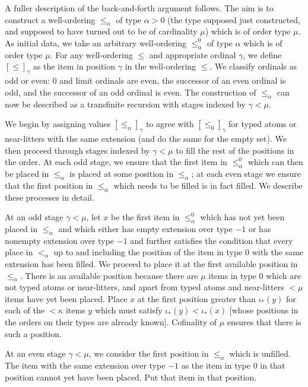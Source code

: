 \documentclass[112pt]{article}
\begin{document}
\begin{description}
A fuller description of the back-and-forth argument follows.  The aim is to construct a well-ordering $\leq_\alpha$ of type $\alpha>0$ (the type supposed just constructed, and supposed to have turned out to be of cardinality $\mu$) which is of order type $\mu$.  As initial data, we take an arbitrary well-ordering $\leq^0_\alpha$ of type $\alpha$ which is of order type $\mu$.  For any well-ordering $\leq$ and appropriate ordinal $\gamma$, we define $[\leq]_\gamma$ as the item in position $\gamma$ in the well-ordering $\leq$.  We classify ordinals as odd or even:  0 and limit ordinals are even, the successor of an even ordinal is odd, and the successor of an odd ordinal is even.  The construction of $\leq_\alpha$ can now be described as a transfinite recursion with stages indexed by $\gamma<\mu$.  

We begin by assigning values $[\leq_\alpha]_\gamma$ to agree with $[\leq_0]_\gamma$ for typed atoms or near-litters
with the same extension (and do the same for the empty set).  We then proceed through stages indexed by $\gamma<\mu$ to fill the rest of the positions in the order.  At each odd stage, we ensure that the first item in $\leq^0_\alpha$ which can then be placed in $\leq_\alpha$ is placed
at some position in $\leq_\alpha$;  at each even stage we ensure that the first position in $\leq_\alpha$ which needs to be filled is in fact filled.  We describe these processes in detail.

At an odd stage $\gamma<\mu$,  let $x$ be the first item in $\leq_\alpha^0$ which has not yet been placed in $\leq_\alpha$ and which either has empty extension over type $-1$ or has nonempty extension over type $-1$ and further satisfies the condition that every place in $<_\alpha$ up to and including the position of the item in type 0 with the same extension has been filled.
We proceed to place it at the first available position in $\leq_\alpha$.  There is an available position because there are $\mu$ items in type 0 which are not typed atoms or near-litters, and apart from typed atoms and near-litters $<\mu$ items have yet been placed.  Place $x$ at the first position greater than $\iota_*(y)$ for each of the $<\kappa$ items $y$ which must satisfy
$\iota_*(y)<\iota_*(x)$ [whose positions in the orders on their types are already known].  Cofinality of $\mu$ ensures that there is such a position.

At an even stage $\gamma<\mu$, we consider the first position in $\leq_\alpha$ which is unfilled.  The item with the same extension over type $-1$ as the item in type 0 in that position cannot yet have been placed.  Put that item in that position.


\end{description}
\end{document}
